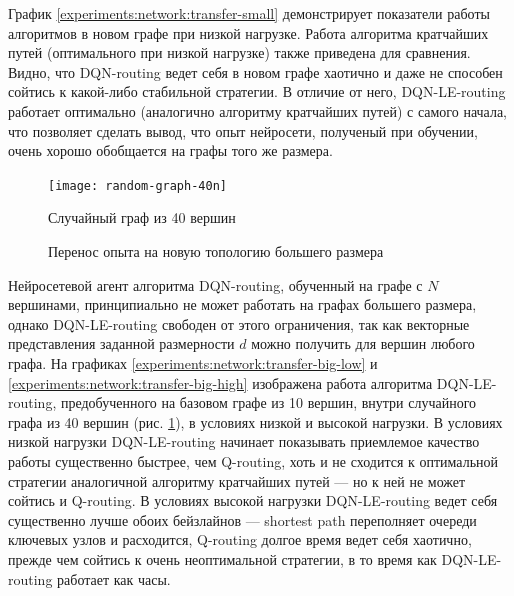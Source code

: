 \documentclass[specification,annotation,times]{itmo-student-thesis}
\theoremstyle{definition}
\begin{document}
График \ref{experiments:network:transfer-small} демонстрирует показатели работы
алгоритмов в новом графе при низкой нагрузке. Работа алгоритма кратчайших
путей (оптимального при низкой нагрузке) также приведена для сравнения. Видно,
что DQN-routing ведет себя в новом графе хаотично и даже не способен сойтись к
какой-либо стабильной стратегии. В отличие от него, DQN-LE-routing работает
оптимально (аналогично алгоритму кратчайших путей) с самого начала, что
позволяет сделать вывод, что опыт нейросети, полученый при обучении, очень
хорошо обобщается на графы того же размера.

\begin{figure}[!h]
  \caption{Случайный граф из 40 вершин}\label{fig-random-net-40n}
  \centering
  \texttt{[image: random-graph-40n]}
\end{figure}

\begin{figure}[!h]
  \centering
  \hfil
  \caption{Перенос опыта на новую топологию большего размера}\label{experiments:network:transfer-big}
\end{figure}

Нейросетевой агент алгоритма DQN-routing, обученный на графе с $N$ вершинами,
принципиально не может работать на графах большего размера, однако
DQN-LE-routing свободен от этого ограничения, так как векторные представления
заданной размерности $d$ можно получить для вершин любого графа. На графиках
\ref{experiments:network:transfer-big-low} и
\ref{experiments:network:transfer-big-high} изображена работа алгоритма
DQN-LE-routing, предобученного на базовом графе из 10 вершин, внутри случайного
графа из 40 вершин (рис. \ref{fig-random-net-40n}), в условиях низкой и высокой
нагрузки. В условиях низкой нагрузки DQN-LE-routing начинает показывать
приемлемое качество работы существенно быстрее, чем Q-routing, хоть и не
сходится к оптимальной стратегии аналогичной алгоритму кратчайших путей --- но к
ней не может сойтись и Q-routing. В условиях высокой нагрузки DQN-LE-routing
ведет себя существенно лучше обоих бейзлайнов --- shortest path переполняет
очереди ключевых узлов и расходится, Q-routing долгое время ведет себя хаотично,
прежде чем сойтись к очень неоптимальной стратегии, в то время как
DQN-LE-routing работает как часы.
\end{document}

